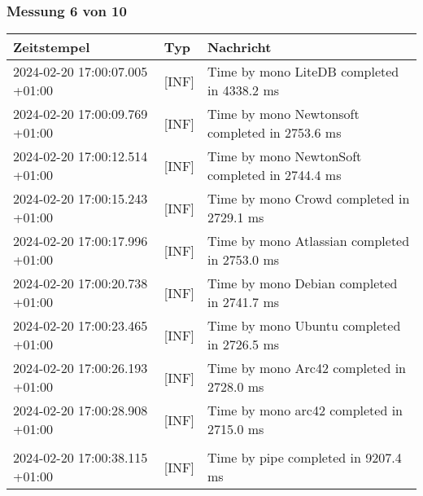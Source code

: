     \subsubsection*{Messung 6 von 10} \label{subsubsec:LiteDbWenigerPaketeAlsDb6von10}
        {
            {\small
                \begin{tabularx}{\textwidth}{|l|l|X|}
                    \hline
                    \textbf{Zeitstempel} & \textbf{Typ} & \textbf{Nachricht} \\
                    \hline
                    \endhead
                    2024-02-20 17:00:07.005 +01:00 & [INF] & Time by mono LiteDB completed in 4338.2 ms \\
                    2024-02-20 17:00:09.769 +01:00 & [INF] & Time by mono Newtonsoft completed in 2753.6 ms \\
                    2024-02-20 17:00:12.514 +01:00 & [INF] & Time by mono NewtonSoft completed in 2744.4 ms \\
                    2024-02-20 17:00:15.243 +01:00 & [INF] & Time by mono Crowd completed in 2729.1 ms \\
                    2024-02-20 17:00:17.996 +01:00 & [INF] & Time by mono Atlassian completed in 2753.0 ms \\
                    2024-02-20 17:00:20.738 +01:00 & [INF] & Time by mono Debian completed in 2741.7 ms \\
                    2024-02-20 17:00:23.465 +01:00 & [INF] & Time by mono Ubuntu completed in 2726.5 ms \\
                    2024-02-20 17:00:26.193 +01:00 & [INF] & Time by mono Arc42 completed in 2728.0 ms \\
                    2024-02-20 17:00:28.908 +01:00 & [INF] & Time by mono arc42 completed in 2715.0 ms \\
                    & & \\
                    2024-02-20 17:00:38.115 +01:00 & [INF] & Time by pipe completed in 9207.4 ms \\
                    \hline
                \end{tabularx}
            }
        }

